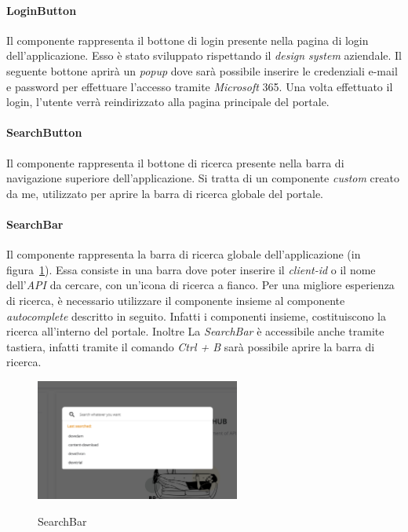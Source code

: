 
\paragraph{LoginButton}\label{par:login-button}
Il componente rappresenta il bottone di login presente nella pagina di login dell'applicazione. Esso è stato sviluppato rispettando il \textit{design system} aziendale.
Il seguente bottone aprirà un \textit{popup} dove sarà possibile inserire le credenziali e-mail e password per effettuare l'accesso tramite \textit{Microsoft} 365.
Una volta effettuato il login, l'utente verrà reindirizzato alla pagina principale del portale.

\paragraph{SearchButton}\label{par:search-button}
Il componente rappresenta il bottone di ricerca presente nella barra di navigazione superiore dell'applicazione.
Si tratta di un componente \textit{custom} creato da me, utilizzato per aprire la barra di ricerca globale del portale. 

\paragraph{SearchBar}\label{par:search-bar}
Il componente rappresenta la barra di ricerca globale dell'applicazione (in figura~\ref{fig:search-bar}). 
Essa consiste in una barra dove poter inserire il \textit{client-id} o il nome dell'\textit{API} da cercare,
con un'icona di ricerca a fianco. Per una migliore esperienza di ricerca, è necessario utilizzare il componente insieme al componente \textit{autocomplete} descritto in seguito.
Infatti i componenti insieme, costituiscono la ricerca all'interno del portale. Inoltre La \textit{SearchBar} è accessibile anche tramite tastiera,
infatti tramite il comando \textit{Ctrl + B} sarà possibile aprire la barra di ricerca.\\

\begin{figure}[ht]
  \centering
  \includegraphics[width=0.6\textwidth, alt={Barra di ricerca globale dell'applicazione}]{images/frontend/SearchBar.jpg}
  \caption{SearchBar}\label{fig:search-bar}
\end{figure}


